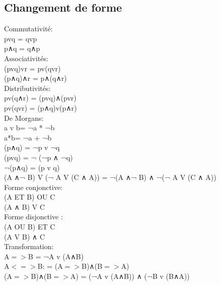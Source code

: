 \subsection{Changement de forme}
\vspace{5mm} %
Commutativité: \\
pvq = qvp \\
p∧q = q∧p \\

\vspace{5mm} %
Associativités: \\
(pvq)vr = pv(qvr) \\
(p∧q)∧r = p∧(q∧r) \\

\vspace{5mm} %
Distributivités: \\
pv(q∧r) = (pvq)∧(pvr) \\
pv(qvr) = (p∧q)v(p∧r) \\

\vspace{5mm} %
De Morgans: \\
a v b= ¬a * ¬b\\
a*b= ¬a + ¬b\\
(p∧q) = ¬p v ¬q  \\
(pvq) = ¬ (¬p ∧ ¬q)  \\
¬(p∧q) = (p v q)  \\
(A ∧¬ B) V (¬ A V (C ∧ A)) =  ¬(A ∧¬ B) ∧ ¬(¬ A V (C ∧ A))\\

\vspace{5mm} %
Forme conjonctive: \\
(A ET B) OU C \\
(A ∧ B) V C\\

\vspace{5mm} %
Forme disjonctive : \\
(A OU B) ET C \\
(A V B) ∧ C\\

\vspace{5mm} %
Transformation: \\
A$=>$B = ¬A v (A∧B) \\
A$<=>$B: = (A$=>$B)∧(B$=>$A)  \\
(A$=>$B)∧(B$=>$A) = (¬A v (A∧B)) ∧ (¬B v (B∧A))
